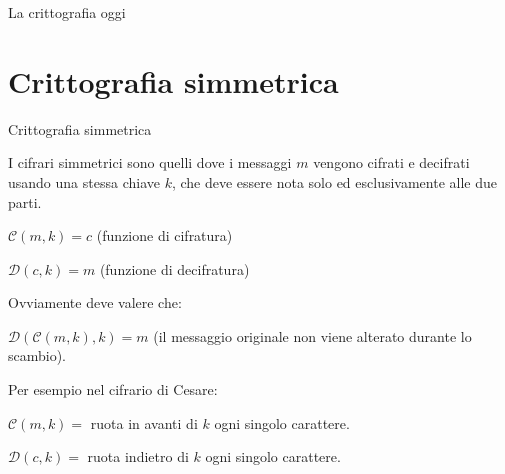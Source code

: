 \documentclass[handout, xcolor=dvipsnames,aspectratio=169]{beamer}
\begin{document}
\begin{frame}{La crittografia oggi}
\end{frame}

\part{Crittografia simmetrica}

\begin{frame}
	\partpage
	\centering
\end{frame}

\begin{frame}{Crittografia simmetrica}

  \pause

  I cifrari simmetrici sono quelli dove i messaggi $m$ vengono cifrati e decifrati usando una stessa chiave $k$, che deve essere nota solo ed esclusivamente alle due parti.
  
  \medskip

  \pause
  $\mathcal{C}(m, k) = c$ (funzione di cifratura)
    
  $\mathcal{D}(c, k) = m$ (funzione di decifratura)
  
  \medskip

  Ovviamente deve valere che:
  
  $\mathcal{D}(\mathcal{C}(m, k), k) = m$ (il messaggio originale non viene alterato durante lo scambio).
  
  \medskip
  \pause
  
  Per esempio nel cifrario di Cesare:
  
  $\mathcal{C}(m, k) = $ ruota in avanti di $k$ ogni singolo carattere.
  
  $\mathcal{D}(c, k) = $ ruota indietro di $k$ ogni singolo carattere.
  
\end{frame}
\end{document}
